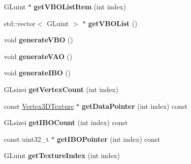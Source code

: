 \begin{DoxyCompactItemize}
\item 
\mbox{\label{classglimac_1_1CubeList_a33f8d08aac4744c18d18969b0b16517c}} 
G\+Luint $\ast$ {\bfseries get\+V\+B\+O\+List\+Item} (int index)
\item 
\mbox{\label{classglimac_1_1CubeList_a82eae5adc714b8f00a23e7ad8d2aee85}} 
std\+::vector$<$ G\+Luint $>$ $\ast$ {\bfseries get\+V\+B\+O\+List} ()
\item 
\mbox{\label{classglimac_1_1CubeList_a7fc99dde6285a3b0ffc14b86f9844edc}} 
void {\bfseries generate\+V\+BO} ()
\item 
\mbox{\label{classglimac_1_1CubeList_a098351d44d9b56a3ca3f4643a0dec302}} 
void {\bfseries generate\+V\+AO} ()
\item 
\mbox{\label{classglimac_1_1CubeList_a179fb745e2097440a88f6818a14a457e}} 
void {\bfseries generate\+I\+BO} ()
\item 
\mbox{\label{classglimac_1_1CubeList_aba84c9ac9d87bedca07244b8d4525c1d}} 
G\+Lsizei {\bfseries get\+Vertex\+Count} (int index)
\item 
\mbox{\label{classglimac_1_1CubeList_a990f5d349a4b6fd690f8b61d0ebacd7f}} 
const \hyperlink{structglimac_1_1Vertex3DTexture}{Vertex3\+D\+Texture} $\ast$ {\bfseries get\+Data\+Pointer} (int index) const
\item 
\mbox{\label{classglimac_1_1CubeList_a317ef23831d1ec198f69586bcd5fa749}} 
G\+Lsizei {\bfseries get\+I\+B\+O\+Count} (int index) const
\item 
\mbox{\label{classglimac_1_1CubeList_af52e02f29a9b4a13418cf4e90eec2562}} 
const uint32\+\_\+t $\ast$ {\bfseries get\+I\+B\+O\+Pointer} (int index) const
\item 
\mbox{\label{classglimac_1_1CubeList_a5be943e092e11ae9a2b4f045cc368bc0}} 
G\+Luint {\bfseries get\+Texture\+Index} (int index)
\item 
\mbox{\label{classglimac_1_1CubeList_ae016eb0b09350a67129d265aad1ba62e}} 

\end{DoxyCompactItemize}
